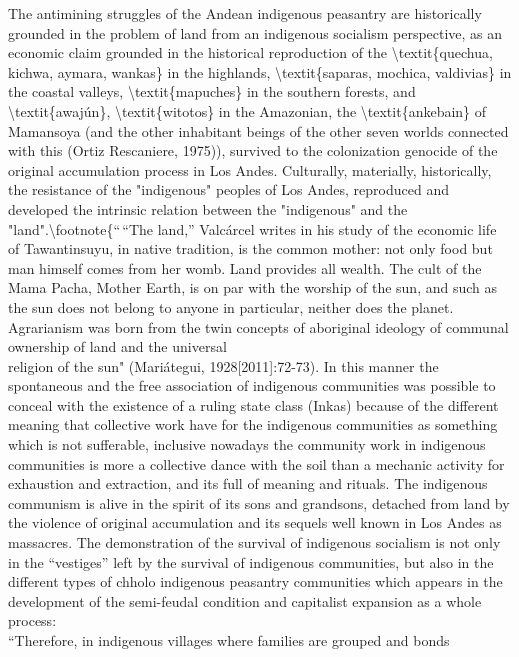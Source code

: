 \documentclass[
]{article}
\begin{document}
The antimining struggles of the Andean indigenous peasantry are
historically grounded in the problem of land from an indigenous
socialism perspective, as an economic claim grounded in the historical
reproduction of the \textbackslash textit\{quechua, kichwa, aymara,
wankas\} in the highlands, \textbackslash textit\{saparas, mochica,
valdivias\} in the coastal valleys, \textbackslash textit\{mapuches\} in
the southern forests, and \textbackslash textit\{awajún\},
\textbackslash textit\{witotos\} in the Amazonian, the
\textbackslash textit\{ankebain\} of Mamansoya (and the other inhabitant
beings of the other seven worlds connected with this (Ortiz Rescaniere,
1975)), survived to the colonization genocide of the original
accumulation process in Los Andes. Culturally, materially, historically,
the resistance of the "indigenous" peoples of Los Andes, reproduced and
developed the intrinsic relation between the "indigenous" and the
"land".\textbackslash footnote\{``\,``The land,'' Valcárcel writes in
his study of the economic life of Tawantinsuyu, in native tradition, is
the common mother: not only food but man himself comes from her womb.
Land provides all wealth. The cult of the Mama Pacha, Mother Earth, is
on par with the worship of the sun, and such as the sun does not belong
to anyone in particular, neither does the planet. Agrarianism was born
from the twin concepts of aboriginal ideology of communal ownership of
land and the universal\\
religion of the sun" (Mariátegui, 1928{[}2011{]}:72-73). In this manner
the spontaneous and the free association of indigenous communities was
possible to conceal with the existence of a ruling state class (Inkas)
because of the different meaning that collective work have for the
indigenous communities as something which is not sufferable, inclusive
nowadays the community work in indigenous communities is more a
collective dance with the soil than a mechanic activity for exhaustion
and extraction, and its full of meaning and rituals. The indigenous
communism is alive in the spirit of its sons and grandsons, detached
from land by the violence of original accumulation and its sequels well
known in Los Andes as massacres. The demonstration of the survival of
indigenous socialism is not only in the ``vestiges'' left by the
survival of indigenous communities, but also in the different types of
chholo indigenous peasantry communities which appears in the development
of the semi-feudal condition and capitalist expansion as a whole
process:\\
``Therefore, in indigenous villages where families are grouped and bonds
\end{document}
